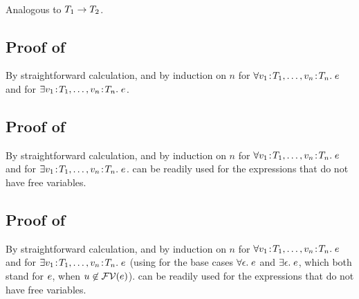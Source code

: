 \begin{bycase}
\Case{\restkinds}\\
Analogous to $T_1\to T_2$.

\end{bycase}



\subsection*{Proof of }

By straightforward calculation, and by induction on $n$ for
$\forall v_1\!:\!T_1,\ldots,v_n\!:\!T_n.\;e$ and for
$\exists v_1\!:\!T_1,\ldots,v_n\!:\!T_n.\;e$.







\subsection*{Proof of }

By straightforward calculation, and by induction on $n$ for
$\forall v_1\!:\!T_1,\ldots,v_n\!:\!T_n.\;e$ and for
$\exists v_1\!:\!T_1,\ldots,v_n\!:\!T_n.\;e$.
 can be readily used for the expressions that do
not have free variables.



\subsection*{Proof of }

By straightforward calculation, and by induction on $n$ for
$\forall v_1\!:\!T_1,\ldots,v_n\!:\!T_n.\;e$ and for
$\exists v_1\!:\!T_1,\ldots,v_n\!:\!T_n.\;e$ (using
 for the base cases $\forall\epsilon.\;e$ and
$\exists\epsilon.\;e$, which both stand for $e$, when
$u\not\in\mathcal{FV}(e)$).  can be readily used
for the expressions that do not have free variables.



